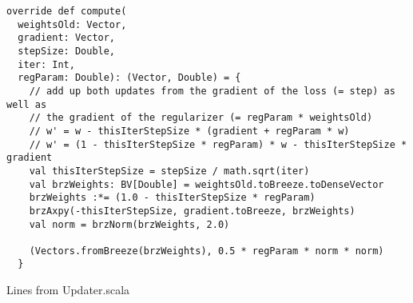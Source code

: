 \begin{listing}[H]
\begin{verbatim}
override def compute(
  weightsOld: Vector,    
  gradient: Vector,  
  stepSize: Double,
  iter: Int,
  regParam: Double): (Vector, Double) = {
    // add up both updates from the gradient of the loss (= step) as well as
    // the gradient of the regularizer (= regParam * weightsOld)
    // w' = w - thisIterStepSize * (gradient + regParam * w)
    // w' = (1 - thisIterStepSize * regParam) * w - thisIterStepSize * gradient
    val thisIterStepSize = stepSize / math.sqrt(iter)
    val brzWeights: BV[Double] = weightsOld.toBreeze.toDenseVector
    brzWeights :*= (1.0 - thisIterStepSize * regParam)
    brzAxpy(-thisIterStepSize, gradient.toBreeze, brzWeights)
    val norm = brzNorm(brzWeights, 2.0)

    (Vectors.fromBreeze(brzWeights), 0.5 * regParam * norm * norm)
  }
\end{verbatim}
\caption{Lines from Updater.scala}
\label{lst:updatercal}
\end{listing}